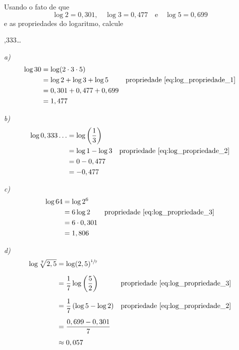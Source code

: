 \begin{example}
  Usando o fato de que
  \[
    \log 2 = 0,301, \quad
    \log 3 = 0,477  \quad\text{e}\quad
    \log 5 = 0,699
  \]
  e as propriedades do logaritmo, calcule
  \vspace{-\baselineskip}
  \begin{mathlist}
    \item {}
    \item {},333\dots
    \item {}
    \item \log {}
  \end{mathlist}

  \solution
  \emph{a)}
  \begin{align*}
    \log 30
    & = \log(2 \cdot 3 \cdot 5)  \\
    & = \log 2 + \log 3 + \log 5 & \text{propriedade~\eqref{eq:log_propriedade_1}} \\
    & = 0,301 + 0,477 + 0,699    \\
    & = 1,477
  \end{align*}

  \emph{b)}
  \begin{align*}
    \log 0,333\dots
    & = \log\left(\frac{1}{3}\right) \\
    & = \log 1 - \log 3              & \text{propriedade~\eqref{eq:log_propriedade_2}} \\
    & = 0 - 0,477                    \\
    & =-0,477
  \end{align*}

  \emph{c)}
  \begin{align*}
    \log 64
    & = \log 2^6      \\
    & = 6 \log 2      & \text{propriedade~\eqref{eq:log_propriedade_3}} \\
    & = 6 \cdot 0,301 \\
    & = 1,806
  \end{align*}

  \emph{d)}
  \begin{align*}
    \log \sqrt[7]{2,5}
    & = \log (2,5)^{\sfrac{1}{7}}                  \\[2mm]
    & = \frac{1}{7} \log \left(\frac{5}{2} \right) & \text{propriedade~\eqref{eq:log_propriedade_3}} \\[2mm]
    & = \frac{1}{7} \left(\log 5-\log 2 \right)    & \text{propriedade~\eqref{eq:log_propriedade_2}} \\[2mm]
    & = \frac{0,699 - 0,301}{7}                    \\[2mm]
    & \approx 0,057
  \end{align*}
\end{example}

